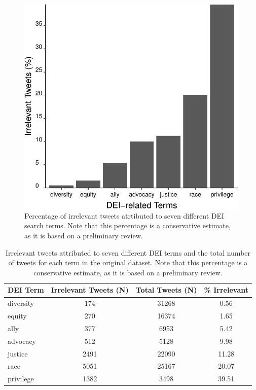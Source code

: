 \documentclass[
  12pt,
  man, donotrepeattitle]{apa6}
\begin{document}
\begin{figure}[H]

{\centering \includegraphics{Bruna_Supplement_files/figure-latex/FigS1-1} 

}

\caption{Percentage of irrelevant tweets atrtibuted to seven different DEI search terms. Note that this percentage is a conservative estimate, as it is based on a preliminary review.}\label{fig:FigS1}
\end{figure}

\begingroup\fontsize{12}{14}\selectfont

\begin{longtable}[l]{lccc}
\caption{\label{tab:Table1}Irrelevant tweets attributed to seven different DEI terms and the total number of tweets for each term in the original dataset. Note that this percentage is a conservative estimate, as it is based on a preliminary review.}\\
\toprule
DEI Term & Irrelevant Tweets (N) & Total Tweets (N) & \% Irrelevant\\
\midrule
diversity & 174 & 31268 & 0.56\\
equity & 270 & 16374 & 1.65\\
ally & 377 & 6953 & 5.42\\
advocacy & 512 & 5128 & 9.98\\
justice & 2491 & 22090 & 11.28\\
race & 5051 & 25167 & 20.07\\
privilege & 1382 & 3498 & 39.51\\
\bottomrule
\end{longtable}
\endgroup{}
\end{document}
